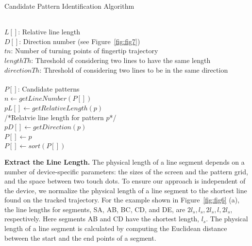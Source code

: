 \renewcommand{\algorithmicforall}{\textbf{for each}}
    \begin{algorithm}[!t]
        \caption{Candidate Pattern Identification Algorithm}
        \label{alg:alg1}
        \begin{algorithmic}[1]
            \REQUIRE~~\\
                $L[]$: Relative line length \\
                $D[]$: Direction number (see Figure~\ref{fig:fig7}) \\
                $tn$: Number of turning points of fingertip trajectory \\
                $lengthTh$: Threshold of considering two lines to have the same length\\
                $directionTh$: Threshold of considering two lines to be in the same direction\\
            \ENSURE~~\\
                $P[]$: Candidate patterns \\

                \STATE $n \leftarrow getLineNumber(P[])$ \\
                \STATE $pL[]  \leftarrow getRelativeLength(p)$ \\
                /*Relatvie line length for pattern $p$*/ \\
                \STATE $pD[] \leftarrow getDirection(p)$ \\
                        \STATE $P[] \leftarrow p$\\
                    \ENDIF
                \ENDIF
            \ENDFOR
            \STATE $P[] \leftarrow sort(P[])$
        \end{algorithmic}
    \end{algorithm}
    
        \vspace{2mm}
        \noindent \textbf{Extract the Line Length.}
        The physical length of a line segment depends
        on a number of device-specific parameters: the sizes of the screen and the pattern grid, and the space between two touch dots.
        To ensure our approach is independent of the device, we normalize the physical length of a line segment to the
        shortest line found on the tracked trajectory. For the
        example shown in Figure~\ref{fig:fig6} (a), the line lengths for segments, SA, AB, BC, CD, and DE, are $2l_{s},l_{s},2l_{s},l,2l_{s}$, respectively.
        Here segments AB and CD have the shortest length, $l_s$. The physical length of a line segment is calculated by computing the
        Euclidean distance between the start and the end points of a segment.

